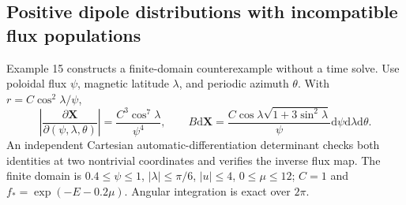\documentclass[11pt,letterpaper]{article}
\newcommand{\dd}{\mathrm d}
\newcommand{\X}{\mathbf X}
\begin{document}
\subsection*{Positive dipole distributions with incompatible flux populations}
Example 15 constructs a finite-domain counterexample without a time solve.
Use poloidal flux $\psi$, magnetic latitude $\lambda$, and periodic azimuth
$\theta$. With $r=C\cos^2\lambda/\psi$,
\begin{equation}
 \left|\frac{\partial\X}{\partial(\psi,\lambda,\theta)}\right|
 =\frac{C^3\cos^7\lambda}{\psi^4},\qquad
 B\dd\X=
 \frac{C\cos\lambda\sqrt{1+3\sin^2\lambda}}{\psi}
 \dd\psi\dd\lambda\dd\theta.
 \label{eq:dipolefluxmeasure}
\end{equation}
An independent Cartesian automatic-differentiation determinant checks both
identities at two nontrivial coordinates and verifies the inverse flux map.
The finite domain is $0.4\le\psi\le1$, $|\lambda|\le\pi/6$,
$|u|\le4$, $0\le\mu\le12$; $C=1$ and
$f_* =\exp(-E-0.2\mu)$. Angular integration is exact over $2\pi$.
\end{document}
